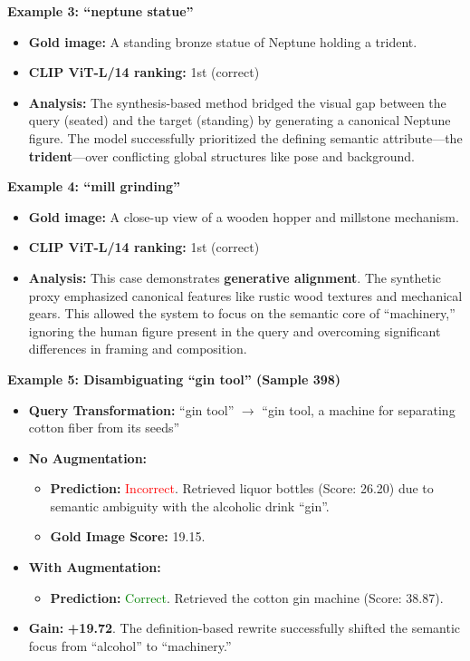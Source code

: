 \documentclass[11pt]{article}
\begin{document}
\textbf{Example 3: ``neptune statue''}
\begin{itemize}
    \item \textbf{Gold image:} A standing bronze statue of Neptune holding a trident.
    \item \textbf{CLIP ViT-L/14 ranking:} 1st (correct)
    \item \textbf{Analysis:} The synthesis-based method bridged the visual gap between the query (seated) and the target (standing) by generating a canonical Neptune figure. The model successfully prioritized the defining semantic attribute—the \textbf{trident}—over conflicting global structures like pose and background.
\end{itemize}

\textbf{Example 4: ``mill grinding''}
\begin{itemize}
    \item \textbf{Gold image:} A close-up view of a wooden hopper and millstone mechanism.
    \item \textbf{CLIP ViT-L/14 ranking:} 1st (correct)
    \item \textbf{Analysis:} This case demonstrates \textbf{generative alignment}. The synthetic proxy emphasized canonical features like rustic wood textures and mechanical gears. This allowed the system to focus on the semantic core of ``machinery,'' ignoring the human figure present in the query and overcoming significant differences in framing and composition.
\end{itemize}

\textbf{Example 5: Disambiguating ``gin tool'' (Sample 398)}
\begin{itemize}
    \item \textbf{Query Transformation:} ``gin tool'' $\rightarrow$ ``gin tool, a machine for separating cotton fiber from its seeds''
    \item \textbf{No Augmentation:}
    \begin{itemize}
        \item \textbf{Prediction:} \textcolor{red}{Incorrect}. Retrieved liquor bottles (Score: 26.20) due to semantic ambiguity with the alcoholic drink ``gin''.
        \item \textbf{Gold Image Score:} 19.15.
    \end{itemize}
    \item \textbf{With Augmentation:}
    \begin{itemize}
        \item \textbf{Prediction:} \textcolor{green}{Correct}. Retrieved the cotton gin machine (Score: 38.87).
    \end{itemize}
    \item \textbf{Gain:} \textbf{+19.72}. The definition-based rewrite successfully shifted the semantic focus from ``alcohol'' to ``machinery.''
\end{itemize}
\end{document}
